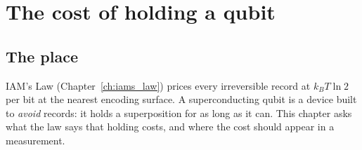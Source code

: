 \chapter{The cost of holding a qubit}\label{ch:xqp}

\section*{The place}
IAM's Law (Chapter~\ref{ch:iams_law}) prices every irreversible record at $k_BT\ln2$ per bit at the nearest encoding surface. A superconducting qubit
is a device built to \emph{avoid} records: it holds a superposition for as long as it can. This chapter asks what the law says that holding costs, and
where the cost should appear in a measurement.

